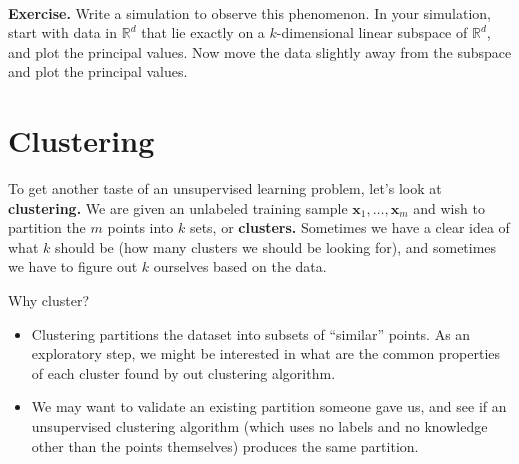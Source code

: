 \documentclass[11pt]{article}
\newcommand{\R}{\ensuremath{\mathbb{R}}}
\newcommand{\V}[1]{\mathbf{#1}}
\begin{document}
~\\
{\bf Exercise.} Write a simulation to observe this phenomenon. In your
simulation, start with data in $\R^d$ that lie exactly on a $k$-dimensional
linear subspace of $\R^d$, and plot the principal values. Now move the data
slightly away from the subspace and plot the principal values. 

\section{Clustering}

To get another taste of an unsupervised learning problem, let's look at {\bf
clustering.} We are given
an unlabeled training sample $\V{x}_1,\ldots,\V{x}_m$ and wish to partition 
the $m$ points into $k$ sets, or {\bf clusters.} Sometimes we have a clear idea
of what $k$ should be (how many clusters we should be looking for), and
sometimes we have to figure out $k$ ourselves based on the data.

Why cluster?
\begin{itemize}
  \item Clustering partitions the dataset into subsets of ``similar'' points. As
    an exploratory step, we might be interested in what are the common
    properties of each cluster found by out clustering algorithm.
  \item We may want to validate an existing partition someone gave us, and see
    if an unsupervised clustering algorithm (which uses no labels and no
    knowledge other than the points themselves) produces the same partition.
\end{itemize}
\end{document}
